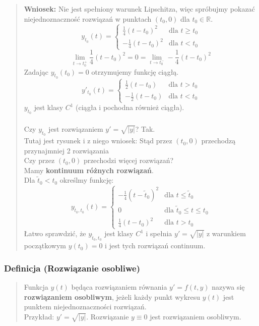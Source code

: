 \documentclass[10pt,a4paper]{article}
\begin{document}
{\begin{quote}
\textbf{Wniosek:} Nie jest spełniony warunek Lipschitza, więc spróbujmy pokazać niejednoznaczność rozwiązań w punktach $(t_0, 0)$ dla $t_0 \in \mathbb{R}$.\\

$$y_{t_0}(t) = \begin{cases} \frac{1}{4}(t - t_0)^2 & \text{dla } t \ge t_0 \\ -\frac{1}{4}(t - t_0)^2 & \text{dla } t < t_0 \end{cases}$$
$$\lim_{t \to t_0^+} \frac{1}{4}(t - t_0)^2 = 0 = \lim_{t \to t_0^-} -\frac{1}{4}(t - t_0)^2$$
Zadając $y_{t_0}(t_0) = 0$ otrzymujemy funkcję ciągłą.\\
$$y'_{t_0}(t) = \begin{cases} \frac{1}{2}(t - t_0) & \text{dla } t > t_0 \\ -\frac{1}{2}(t - t_0) & \text{dla } t < t_0 \end{cases}$$
$y_{t_0}$ jest klasy $C^1$ (ciągła i pochodna również ciągła).\\\\
Czy $y_{t_0}$ jest rozwiązaniem $y' = \sqrt{|y|}$? Tak.\\

Tutaj jest rysunek i z niego wniosek: Stąd przez $(t_0, 0)$ przechodzą przynajmniej 2 rozwiązania\\

Czy przez $(t_0, 0)$ przechodzi więcej rozwiązań?\\
Mamy \textbf{kontinuum różnych rozwiązań}.\\
Dla $\tilde{t}_0 < t_0$ określmy funkcję:\\
$$y_{\tilde{t}_0, t_0}(t) = \begin{cases} -\frac{1}{4}(t - \tilde{t}_0)^2 & \text{dla } t \le \tilde{t}_0 \\ 0 & \text{dla } \tilde{t}_0 \leq t \leq t_0 \\ \frac{1}{4}(t - t_0)^2 & \text{dla } t > t_0 \end{cases}$$
Łatwo sprawdzić, że $y_{\tilde{t}_0, t_0}$ jest klasy $C^1$ i spełnia $y' = \sqrt{|y|}$ z warunkiem początkowym $y(t_0) = 0$ i jest tych rozwiązań continuum.
\end{quote}

\subsubsection*{Definicja (Rozwiązanie osobliwe)}
\begin{quote}
Funkcja $y(t)$ będąca rozwiązaniem równania $y'=f(t,y)$ nazywa się \textbf{rozwiązaniem osobliwym}, jeżeli każdy punkt wykresu $y(t)$ jest punktem niejednoznaczności rozwiązań.\\
Przykład: $y' = \sqrt{|y|}$. Rozwiązanie $y \equiv 0$ jest rozwiązaniem osobliwym.
\end{quote}

}
\end{document}
